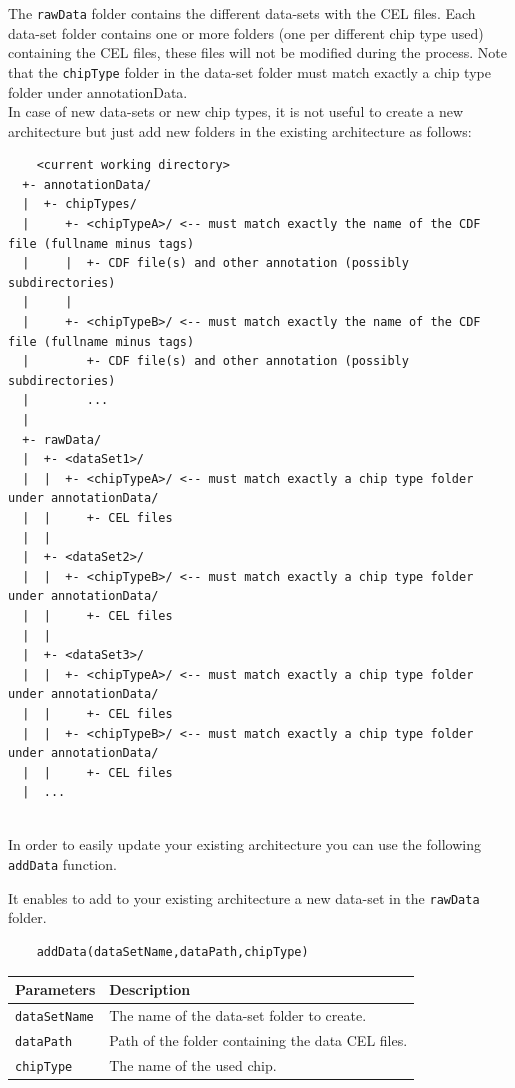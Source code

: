 \documentclass[a4paper,10pt]{article}
\begin{document}
		The \texttt{rawData} folder contains the different data-sets with the CEL files. Each data-set folder contains one or more folders (one per different chip type used) containing the CEL files, these files will not be modified during the process. Note that the \texttt{chipType} folder in the data-set folder must match exactly a chip type folder under annotationData.\\
    
    In case of new data-sets or new chip types, it is not useful to create a new architecture but just add new folders in the existing architecture as follows:
		\begin{small}
			\begin{verbatim}
	<current working directory>
  +- annotationData/
  |  +- chipTypes/
  |     +- <chipTypeA>/ <-- must match exactly the name of the CDF file (fullname minus tags)
  |     |  +- CDF file(s) and other annotation (possibly subdirectories)
  |     |
  |     +- <chipTypeB>/ <-- must match exactly the name of the CDF file (fullname minus tags)
  |        +- CDF file(s) and other annotation (possibly subdirectories)
  |        ...
  |
  +- rawData/
  |  +- <dataSet1>/
  |  |  +- <chipTypeA>/ <-- must match exactly a chip type folder under annotationData/
  |  |     +- CEL files
  |  |
  |  +- <dataSet2>/
  |  |  +- <chipTypeB>/ <-- must match exactly a chip type folder under annotationData/
  |  |     +- CEL files
  |  |
  |  +- <dataSet3>/
  |  |  +- <chipTypeA>/ <-- must match exactly a chip type folder under annotationData/
  |  |     +- CEL files
  |  |  +- <chipTypeB>/ <-- must match exactly a chip type folder under annotationData/
  |  |     +- CEL files
  |  ...      
			\end{verbatim}
		\end{small}	
	
		~~\\
		
		In order to easily update your existing architecture you can use the following \texttt{addData} function.
		
		It enables to add to your existing architecture a new data-set in the \texttt{rawData} folder.
		
		\begin{verbatim}
	addData(dataSetName,dataPath,chipType)
		\end{verbatim}
	
		\begin{center}
			\begin{tabular}{|l|l|}
				\hline
				Parameters & Description\\
				\hline
				\texttt{dataSetName} & The name of the data-set folder to create.\\
				\texttt{dataPath} &  Path of the folder containing the data CEL files.\\
				\texttt{chipType} & The name of the used chip.\\ 
				\hline	
			\end{tabular}		
		\end{center}
		
\end{document}
